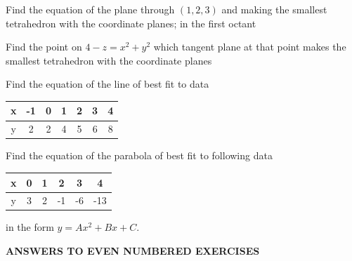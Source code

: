 \documentclass[11pt]{amsbook}
\begin{document}

\begin{hEnumerateArabic}

\item Find the equation of the plane through $(1, 2, 3)$ and making the smallest tetrahedron with the coordinate planes; in the first octant
\\

\item Find the point on $4-z = x^2 + y^2$ which tangent plane at that point makes the smallest tetrahedron with the coordinate planes
\\

\item Find the equation of the line of best fit to data
  \begin{center}
    \begin{tabular}{ c|cccccc }
      x & -1 & 0 & 1 & 2 & 3 & 4 \\
      \hline
      y & 2 & 2 & 4 & 5 & 6 & 8 \\
    \end{tabular}
  \end{center}

\item Find the equation of the parabola of best fit to following data
  \begin{center}
    \begin{tabular}{ c|ccccc }
      x & 0 & 1 & 2 & 3 & 4 \\
      \hline
      y & 3 & 2 & -1 & -6 & -13 \\
    \end{tabular}
  \end{center}
in the form $y = Ax^2 + Bx + C$.

\end{hEnumerateArabic}

\begin{center}
\textbf{ANSWERS TO EVEN NUMBERED EXERCISES}\\
\end{center}
\end{document}
